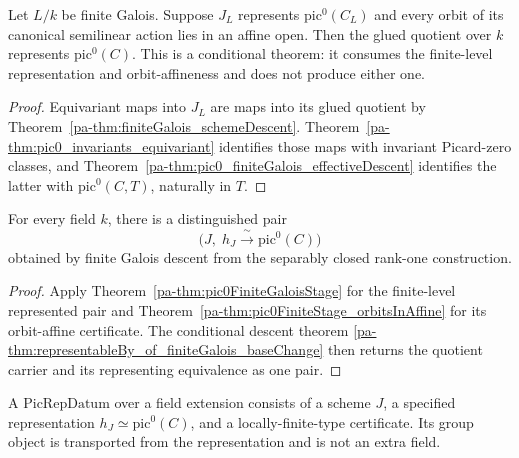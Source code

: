 \begin{theorem}
  \label{pa-thm:representableBy_of_finiteGalois_baseChange}
  \leanok

  Let \(L/k\) be finite Galois.  Suppose \(J_L\) represents
  \(\mathrm{pic}^0(C_L)\) and every orbit of its canonical semilinear action lies in an affine
  open.  Then the glued quotient over \(k\) represents \(\mathrm{pic}^0(C)\).  This is a
  conditional theorem: it consumes the finite-level representation and orbit-affineness and
  does not produce either one.
\end{theorem}
\begin{proof}
  \leanok
  Equivariant maps into \(J_L\) are maps into its glued quotient by
  Theorem~\ref{pa-thm:finiteGalois_schemeDescent}.  Theorem~\ref{pa-thm:pic0_invariants_equivariant}
  identifies those maps with invariant Picard-zero classes, and
  Theorem~\ref{pa-thm:pic0_finiteGalois_effectiveDescent} identifies the latter with
  \(\mathrm{pic}^0(C,T)\), naturally in \(T\).
\end{proof}

\begin{definition}
  \label{pa-def:pic0_representableBy}
  \notready
  For every field \(k\), there is a distinguished pair
  \[
    \bigl(J,\;h_J\xrightarrow{\ \sim\ }\mathrm{pic}^0(C)\bigr)
  \]
  obtained by finite Galois descent from the separably closed rank-one construction.
\end{definition}
\begin{proof}
  Apply Theorem~\ref{pa-thm:pic0FiniteGaloisStage} for the finite-level represented pair and
  Theorem~\ref{pa-thm:pic0FiniteStage_orbitsInAffine} for its orbit-affine certificate.  The
  conditional descent theorem
  \ref{pa-thm:representableBy_of_finiteGalois_baseChange} then returns the quotient carrier and
  its representing equivalence as one pair.
\end{proof}

\begin{definition}
  \label{pa-def:picRepDatum}
  \leanok

  A \(\mathrm{PicRepDatum}\) over a field extension consists of a scheme \(J\), a specified
  representation \(h_J\simeq\mathrm{pic}^0(C)\), and a locally-finite-type certificate.  Its
  group object is transported from the representation and is not an extra field.
\end{definition}

